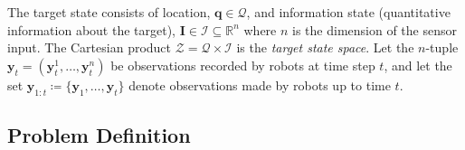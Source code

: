 \documentclass[letterpaper, 10 pt, conference]{ieeeconf}
\newcommand{\Ram}[1]{{\normalsize{\textbf{({\color{green}Ram:\ }#1)}}}}
\begin{document}
The target state consists of location, $\bm{q} \in \mathcal{Q}$, and information state (quantitative information about the target), $\bm{I} \in \mathcal{I} \subseteq \mathbb{R}^n$ where $n$ is the dimension of the sensor input.
The Cartesian product $\mathcal{Z} = \mathcal{Q} \times \mathcal{I}$ is the \emph{target state space}.
Let the $n$-tuple $\bm{y}_t=(\bm{y}_t^1,\dots,\bm{y}_t^n)$ be observations recorded by robots at time step $t$, and let the set $\bm{y}_{1:t}\coloneqq \lbrace \bm{y}_1,\dots,\bm{y}_t \rbrace$ denote observations made by robots up to time $t$. 



\subsection{Problem Definition}
\end{document}
